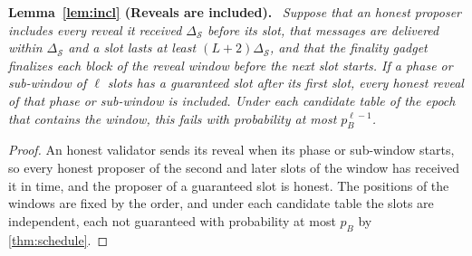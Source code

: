 \documentclass[10pt,journal,compsoc]{IEEEtran}
\theoremstyle{tplain}
\theoremstyle{tdef}
\theoremstyle{remark}
\newenvironment{restate}[1]{\par\smallskip\noindent\textbf{#1.}\ \itshape\ignorespaces}{\par\smallskip}
\begin{document}
\begin{restate}{Lemma~\ref{lem:incl} (Reveals are included)}
Suppose that an honest proposer includes every reveal it received $\Delta_{\mathcal S}$ before its slot, that messages are delivered within $\Delta_{\mathcal S}$ and a slot lasts at least $(L+2)\Delta_{\mathcal S}$, and that the finality gadget finalizes each block of the reveal window before the next slot starts. If a phase or sub-window of $\ell$ slots has a guaranteed slot after its first slot, every honest reveal of that phase or sub-window is included. Under each candidate table of the epoch that contains the window, this fails with probability at most $p_B^{\ell-1}$.
\end{restate}
\begin{proof}
An honest validator sends its reveal when its phase or sub-window starts, so every honest proposer of the second and later slots of the window has received it in time, and the proposer of a guaranteed slot is honest. The positions of the windows are fixed by the order, and under each candidate table the slots are independent, each not guaranteed with probability at most $p_B$ by \cref{thm:schedule}.
\end{proof}
\end{document}
